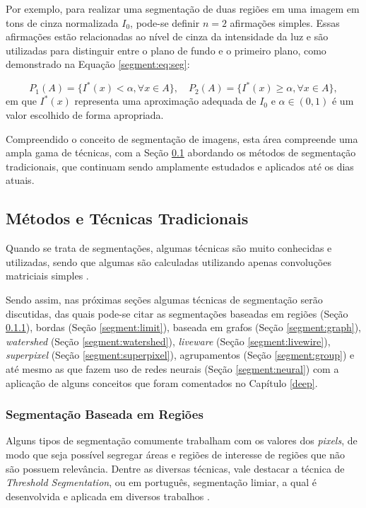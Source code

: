 Por exemplo, para realizar uma segmentação de duas regiões em uma imagem em tons de cinza normalizada $I_0$, pode-se definir $n = 2$ afirmações simples. Essas afirmações estão relacionadas ao nível de cinza da intensidade da luz e são utilizadas para distinguir entre o plano de fundo e o primeiro plano, como demonstrado na Equação \ref{segment:eq:seg}:

\begin{equation}
\label{segment:eq:seg}
    P_1(A) = \{ I^\ast(x) < \alpha, \forall x \in A \}, \quad P_2(A) = \{ I^\ast(x) \geq \alpha, \forall x \in A \},
\end{equation}
em que $I^\ast(x)$ representa uma aproximação adequada de $I_0$ e $\alpha \in (0,1)$ é um valor escolhido de forma apropriada.

Compreendido o conceito de segmentação de imagens, esta área compreende uma ampla gama de técnicas, com a Seção \ref{segment:segment} abordando os métodos de segmentação tradicionais, que continuam sendo amplamente estudados e aplicados até os dias atuais.

\subsection{Métodos e Técnicas Tradicionais}
\label{segment:segment}

Quando se trata de segmentações, algumas técnicas são muito conhecidas e utilizadas, sendo que algumas são calculadas utilizando apenas convoluções matriciais simples \citep{Yuheng2017}.

Sendo assim, nas próximas seções algumas técnicas de segmentação serão discutidas, das quais pode-se citar as segmentações baseadas em regiões (Seção \ref{segment:region}), bordas  (Seção \ref{segment:limit}), baseada em grafos (Seção \ref{segment:graph}), \textit{watershed} (Seção \ref{segment:watershed}), \textit{liveware} (Seção \ref{segment:livewire}), \textit{superpixel} (Seção \ref{segment:superpixel}), agrupamentos (Seção \ref{segment:group}) e até mesmo as que fazem uso de redes neurais  (Seção \ref{segment:neural}) com a aplicação de alguns conceitos que foram comentados no Capítulo \ref{deep}.

\subsubsection{Segmentação Baseada em Regiões}
\label{segment:region}

Alguns tipos de segmentação comumente trabalham com os valores dos \textit{pixels}, de modo que seja possível segregar áreas e regiões de interesse de regiões que não são possuem relevância. Dentre as diversas técnicas, vale destacar a técnica de \textit{Threshold Segmentation}, ou em português, segmentação limiar, a qual é desenvolvida e aplicada em diversos trabalhos \citep{Yanowitz1989}.

